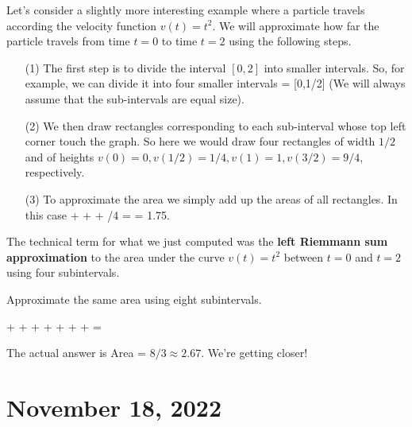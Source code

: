 \documentclass[11pt]{amsart}
\begin{document}
\newpage

Let's consider a slightly more interesting example where a particle travels according the velocity function $v(t) = t^2$. 
We will approximate how far the particle travels from time $t=0$ to time $t=2$ using the following steps.

\begin{itemize}
\item[(1)] The first step is to divide the interval $[0,2]$ into smaller intervals. 
So, for example, we can divide it into four smaller intervals
\beqn
[0,2] = [0,1/2] \cup [1/2,1] \cup [1,3/2] \cup [3/2,2] 
\eeqn
(We will always assume that the sub-intervals are equal size).
\item[(2)] 
We then draw rectangles corresponding to each sub-interval whose top left corner touch the graph. 
So here we would draw four rectangles of width $1/2$ and of heights $v(0) = 0, v(1/2) = 1/4, v(1) = 1, v(3/2) = 9/4$, respectively. 
\item[(3)] To approximate the area we simply add up the areas of all rectangles.
In this case
\beqn
{} \approx {}  +  \cdot {} +   +  /4 =  = 1.75.
\eeqn
\end{itemize}

\vspace{2cm}

The technical term for what we just computed was the {\bf left Riemmann sum approximation} to the area under the curve $v(t) = t^2$ between $t=0$ and $t=2$ using four subintervals. 

\begin{eg}
Approximate the same area using eight subintervals.
\end{eg}

\vspace{2cm}

\beqn
{} \approx {}  +  \cdot {} +  \cdot {} +  \cdot {} +   +  \cdot {} +  \cdot {} +  \cdot {} =  
\eeqn


The actual answer is Area = $8/3 \approx 2.67$.
We're getting closer! 


\newpage

\section*{November 18, 2022}
\end{document}
